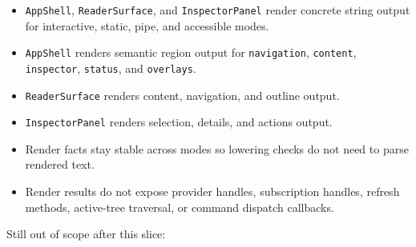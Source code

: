 \begin{itemize}
\tightlist
\item
  \texttt{A\allowbreak{}p\allowbreak{}p\allowbreak{}S\allowbreak{}h\allowbreak{}e\allowbreak{}l\allowbreak{}l}, \texttt{R\allowbreak{}e\allowbreak{}a\allowbreak{}d\allowbreak{}e\allowbreak{}r\allowbreak{}S\allowbreak{}u\allowbreak{}r\allowbreak{}f\allowbreak{}a\allowbreak{}c\allowbreak{}e}, and \texttt{I\allowbreak{}n\allowbreak{}s\allowbreak{}p\allowbreak{}e\allowbreak{}c\allowbreak{}t\allowbreak{}o\allowbreak{}r\allowbreak{}P\allowbreak{}a\allowbreak{}n\allowbreak{}e\allowbreak{}l} render concrete string output for interactive, static, pipe, and accessible modes.
\item
  \texttt{A\allowbreak{}p\allowbreak{}p\allowbreak{}S\allowbreak{}h\allowbreak{}e\allowbreak{}l\allowbreak{}l} renders semantic region output for \texttt{n\allowbreak{}a\allowbreak{}v\allowbreak{}i\allowbreak{}g\allowbreak{}a\allowbreak{}t\allowbreak{}i\allowbreak{}o\allowbreak{}n}, \texttt{c\allowbreak{}o\allowbreak{}n\allowbreak{}t\allowbreak{}e\allowbreak{}n\allowbreak{}t}, \texttt{i\allowbreak{}n\allowbreak{}s\allowbreak{}p\allowbreak{}e\allowbreak{}c\allowbreak{}t\allowbreak{}o\allowbreak{}r}, \texttt{s\allowbreak{}t\allowbreak{}a\allowbreak{}t\allowbreak{}u\allowbreak{}s}, and \texttt{o\allowbreak{}v\allowbreak{}e\allowbreak{}r\allowbreak{}l\allowbreak{}a\allowbreak{}y\allowbreak{}s}.
\item
  \texttt{R\allowbreak{}e\allowbreak{}a\allowbreak{}d\allowbreak{}e\allowbreak{}r\allowbreak{}S\allowbreak{}u\allowbreak{}r\allowbreak{}f\allowbreak{}a\allowbreak{}c\allowbreak{}e} renders content, navigation, and outline output.
\item
  \texttt{I\allowbreak{}n\allowbreak{}s\allowbreak{}p\allowbreak{}e\allowbreak{}c\allowbreak{}t\allowbreak{}o\allowbreak{}r\allowbreak{}P\allowbreak{}a\allowbreak{}n\allowbreak{}e\allowbreak{}l} renders selection, details, and actions output.
\item
  Render facts stay stable across modes so lowering checks do not need to parse rendered text.
\item
  Render results do not expose provider handles, subscription handles, refresh methods, active-tree traversal, or command dispatch callbacks.
\end{itemize}

Still out of scope after this slice:

